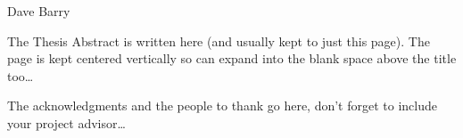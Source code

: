 \documentclass[
11pt, %
english, %
singlespacing, %
headsepline, %
]{MastersDoctoralThesis} %
\begin{document}
\hfill Dave Barry


\begin{thesisabstract}
\addchaptertocentry{\abstractname} %
The Thesis Abstract is written here (and usually kept to just this page). The page is kept centered vertically so can expand into the blank space above the title too\ldots
\end{thesisabstract}


\begin{acknowledgements}
\addchaptertocentry{\acknowledgementname} %
The acknowledgments and the people to thank go here, don't forget to include your project advisor\ldots
\end{acknowledgements}


\tableofcontents %




\mainmatter %

\pagestyle{thesis} %

\end{document}

